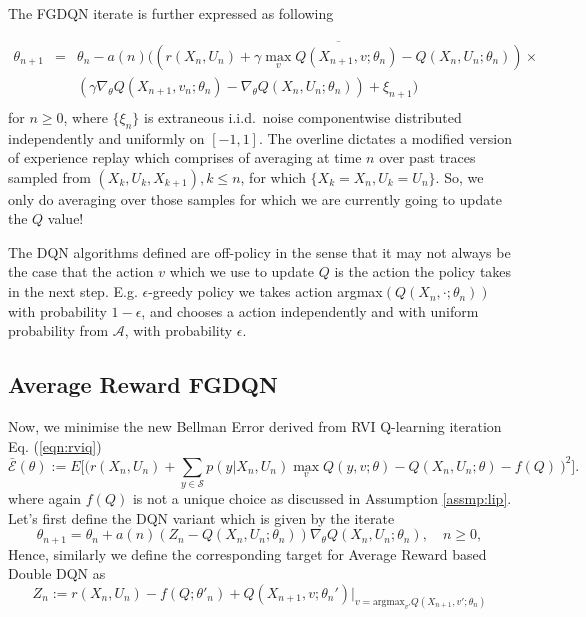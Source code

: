 \documentclass{article}
\theoremstyle{definition}
\newcommand{\E}{\mathcal{E}}
\begin{document}
The FGDQN iterate is further expressed as following

\begin{eqnarray}
\theta_{n+1} &=& \theta_n - a(n)\Bigg(\overline{(r(X_n,U_n) + \gamma\max_v Q(X_{n+1}, v; \theta_n) - Q(X_n, U_n;\theta_n))}\times \nonumber \\
&& \left(\gamma\nabla_\theta Q(X_{n+1}, v_n; \theta_n) - \nabla_\theta Q(X_n, U_n; \theta_n)\right)  + \xi_{n+1}\Bigg)\nonumber \\
\ && \ \label{FG-DQN_expreplay}
\end{eqnarray}
for $n \geq 0$, where $\{\xi_n\}$  is extraneous i.i.d.\  noise componentwise distributed independently and uniformly on $[-1,1]$. The overline dictates a modified version of experience replay which comprises of averaging at time $n$ over past traces sampled from $(X_k, U_k, X_{k+1}), k \leq  n$, for which $\{X_k = X_n, U_k = U_n\}$. So, we only do averaging over those samples for which we are currently going to update the $Q$ value!

The DQN algorithms defined are off-policy in the sense that it may not always be the case that the action $v$ which we use to update $Q$ is the action the policy takes in the next step. E.g. $\epsilon$-greedy policy we takes action argmax$(Q(X_n, \cdot; \theta_n))$ with probability $1 - \epsilon$, and chooses a action independently and with uniform probability from $\mathcal{A}$, with probability $\epsilon$.
\subsection{Average Reward FGDQN}
Now, we minimise the new Bellman Error derived from RVI Q-learning iteration Eq. (\ref{eqn:rviq})
\begin{equation}
\bar{\E}(\theta) := E\Big[\Big(r(X_n, U_n) + \sum_{y\in\mathcal{S}} p(y|X_n,U_n)
\max_v Q(y,v; \theta) - Q(X_n,U_n;\theta) - f(Q)\ \Big)^2\Big]. \label{Ebar}
\end{equation}
where again $f(Q)$ is not a unique choice as discussed in Assumption \ref{assmp:lip}.\\
Let's first define the DQN variant which is given by the iterate
\begin{equation}
\theta_{n+1} = \theta_n +a(n)(Z_n - Q(X_n, U_n; \theta_n))\nabla_\theta Q(X_n, U_n; \theta_n), \quad n \geq 0,
\end{equation}
Hence, similarly we define the corresponding target for Average Reward based Double DQN as
\begin{equation}
Z_n := r(X_n,U_n)-f(Q;\theta'_n)+ Q(X_{n+1},v;\theta_n')\Big|_{v = \mbox{argmax}_{v'} Q(X_{n+1}, v' ; \theta_n)}
\end{equation}
\end{document}
